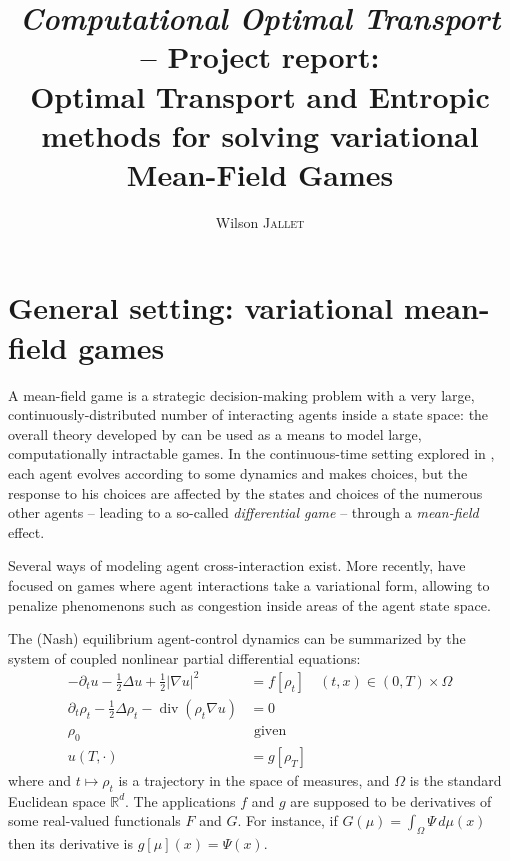 \documentclass{article}
\author{Wilson \textsc{Jallet}}
\title{
{\large\textit{Computational Optimal Transport} -- \textsf{Project report:}}\\
Optimal Transport and Entropic methods for solving variational Mean-Field Games}
\newcommand{\RR}{\mathbb{R}}
\DeclareMathOperator{\divg}{div}
\begin{document}
\maketitle


\section{General setting: variational mean-field games}

A mean-field game \cite{LASRY2006619,LASRY2006679} is a strategic decision-making problem with a very large, continuously-distributed number of interacting agents inside a state space: the overall theory developed by \citeauthor{LASRY2006619} can be used as a means to model large, computationally intractable games. In the continuous-time setting explored in \cite{LASRY2006679}, each agent evolves according to some dynamics and makes choices, but the response to his choices are affected by the states and choices of the numerous other agents -- leading to a so-called \textit{differential game} -- through a \textit{mean-field} effect.

Several ways of modeling agent cross-interaction exist. More recently, \cite{benamou:hal-01295299} have focused on games where agent interactions take a variational form, allowing to penalize phenomenons such as congestion inside areas of the agent state space.


The (Nash) equilibrium agent-control dynamics can be summarized by the system of coupled nonlinear partial differential equations:
\begin{subequations}\label{eq:VariationalQuadraticMFG}
\begin{align}\label{eq:VarQuadMFGHJB}
	-\partial_t u - \frac{1}{2}\Delta u + \frac12|\nabla u|^2 &= f[\rho_t] \quad (t,x) \in  (0, T) \times \Omega \\\label{eq:VarQuadMFGKolmo}
	\partial_t \rho_t - \frac{1}{2}\Delta\rho_t - \divg(\rho_t \nabla u) &= 0 \\
	\rho_0 &\text{ given} \\
	u(T, \cdot) &= g[\rho_T]
\end{align}
\end{subequations}
where and $t\mapsto \rho_t$ is a trajectory in the space of measures, and $\Omega$ is the standard Euclidean space $\RR^d$. The applications $f$ and $g$ are supposed to be derivatives of some real-valued functionals $F$ and $G$. For instance, if $G(\mu) = \int_\Omega \Psi\,d\mu(x)$ then its derivative is $g[\mu](x) = \Psi(x)$.
\end{document}
